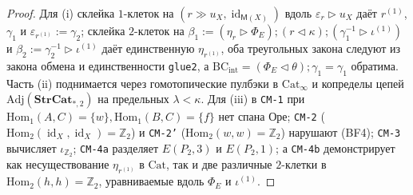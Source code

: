 \documentclass[11pt]{article}
\theoremstyle{plain}
\theoremstyle{definition}
\newcommand{\Cat}{\mathrm{Cat}}
\DeclareMathOperator{\id}{id}
\begin{document}
\begin{proof}
Для (i) склейка $1$-клеток на $(r \gg u_X, \id_{\mathsf{M}(X)})$ вдоль $\varepsilon_r \triangleright u_X$ даёт $r^{(1)}$, $\gamma_1$ и $\varepsilon_{r^{(1)}} := \gamma_2$; склейка $2$-клеток на $\beta_1 := (\eta_r \triangleright \Phi_E) \mathbin{;} (r \triangleleft \kappa) \mathbin{;} (\gamma_1^{-1} \triangleright \iota^{(1)})$ и $\beta_2 := \gamma_2^{-1} \triangleright \iota^{(1)}$ даёт единственную $\eta_{r^{(1)}}$, оба треугольных закона следуют из закона обмена и единственности \texttt{glue2}, а $\mathrm{BC}_{\mathrm{int}} = (\Phi_E \triangleleft \theta) \mathbin{;} \gamma_1 = \gamma_1$ обратима. Часть (ii) поднимается через гомотопические пулбэки в $\Cat_\infty$ и копределы цепей $\mathrm{Adj}(\mathbf{StrCat}_{*,2})$ на предельных $\lambda < \kappa$. Для (iii) в \texttt{CM-1} при $\mathrm{Hom}_1(A,C)=\{w\}, \mathrm{Hom}_1(B,C)=\{f\}$ нет спана Оре; \texttt{CM-2} ($\mathrm{Hom}_2(\id_X,\id_X)=\mathbb{Z}_2$) и \texttt{CM-2'} ($\mathrm{Hom}_2(w,w)=\mathbb{Z}_2$) нарушают (BF4); \texttt{CM-3} вычисляет $\iota_{\mathbb{Z}_2}$; \texttt{CM-4a} разделяет $E(P_2,3)$ и $E(P_2,1)$; а \texttt{CM-4b} демонстрирует как несуществование $\eta_{r^{(1)}}$ в $\Cat$, так и две различные $2$-клетки в $\mathrm{Hom}_2(h,h)=\mathbb{Z}_2$, уравниваемые вдоль $\Phi_E$ и $\iota^{(1)}$.
\end{proof}
\end{document}
